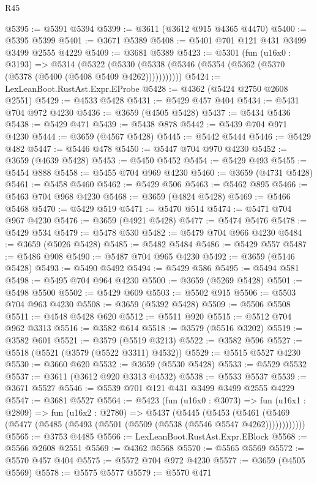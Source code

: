 \begin{lexlean}{R45}
\begin{coremodule}
@5395 := @5391 @5394
@5399 := @3611 (@3612 @915 @4365 @4470)
@5400 := @5395 @5399
@5401 := @3671 @5389
@5408 := @5401 @701 @121 @431 @3499 @3499 @2555 @4229
@5409 := @3681 @5389
@5423 := @5301
    (fun (u16x0 : @3193) =>
    @5314
      (@5322 (@5330 (@5338 (@5346 (@5354 (@5362 (@5370 (@5378 (@5400 (@5408 @5409 @4262)))))))))))
@5424 := LexLeanBoot.RustAst.Expr.EProbe
@5428 := @4362 (@5424 @2750 @2608 @2551)
@5429 := @4533 @5428
@5431 := @5429 @457 @404
@5434 := @5431 @704 @972 @4230
@5436 := @3659 (@4505 @5428)
@5437 := @5434 @5436
@5438 := @5429 @471
@5439 := @5438 @878
@5442 := @5439 @704 @971 @4230
@5444 := @3659 (@4567 @5428)
@5445 := @5442 @5444
@5446 := @5429 @482
@5447 := @5446 @478
@5450 := @5447 @704 @970 @4230
@5452 := @3659 (@4639 @5428)
@5453 := @5450 @5452
@5454 := @5429 @493
@5455 := @5454 @888
@5458 := @5455 @704 @969 @4230
@5460 := @3659 (@4731 @5428)
@5461 := @5458 @5460
@5462 := @5429 @506
@5463 := @5462 @895
@5466 := @5463 @704 @968 @4230
@5468 := @3659 (@4824 @5428)
@5469 := @5466 @5468
@5470 := @5429 @519
@5471 := @5470 @514
@5474 := @5471 @704 @967 @4230
@5476 := @3659 (@4921 @5428)
@5477 := @5474 @5476
@5478 := @5429 @534
@5479 := @5478 @530
@5482 := @5479 @704 @966 @4230
@5484 := @3659 (@5026 @5428)
@5485 := @5482 @5484
@5486 := @5429 @557
@5487 := @5486 @908
@5490 := @5487 @704 @965 @4230
@5492 := @3659 (@5146 @5428)
@5493 := @5490 @5492
@5494 := @5429 @586
@5495 := @5494 @581
@5498 := @5495 @704 @964 @4230
@5500 := @3659 (@5269 @5428)
@5501 := @5498 @5500
@5502 := @5429 @609
@5503 := @5502 @915
@5506 := @5503 @704 @963 @4230
@5508 := @3659 (@5392 @5428)
@5509 := @5506 @5508
@5511 := @4548 @5428 @620
@5512 := @5511 @920
@5515 := @5512 @704 @962 @3313
@5516 := @3582 @614
@5518 := @3579 (@5516 @3202)
@5519 := @3582 @601
@5521 := @3579 (@5519 @3213)
@5522 := @3582 @596
@5527 := @5518 (@5521 (@3579 (@5522 @3311) @4532))
@5529 := @5515 @5527 @4230
@5530 := @3660 @620
@5532 := @3659 (@5530 @5428)
@5533 := @5529 @5532
@5537 := @3611 (@3612 @920 @3313 @4532)
@5538 := @5533 @5537
@5539 := @3671 @5527
@5546 := @5539 @701 @121 @431 @3499 @3499 @2555 @4229
@5547 := @3681 @5527
@5564 := @5423
    (fun (u16x0 : @3073) =>
    fun (u16x1 : @2809) =>
    fun (u16x2 : @2780) =>
    @5437
      (@5445
        (@5453
          (@5461 (@5469 (@5477 (@5485 (@5493 (@5501 (@5509 (@5538 (@5546 @5547 @4262))))))))))))
@5565 := @3753 @4485
@5566 := LexLeanBoot.RustAst.Expr.EBlock
@5568 := @5566 @2608 @2551
@5569 := @4362 @5568
@5570 := @5565 @5569
@5572 := @5570 @457 @404
@5575 := @5572 @704 @972 @4230
@5577 := @3659 (@4505 @5569)
@5578 := @5575 @5577
@5579 := @5570 @471

\end{coremodule}
\end{lexlean}
